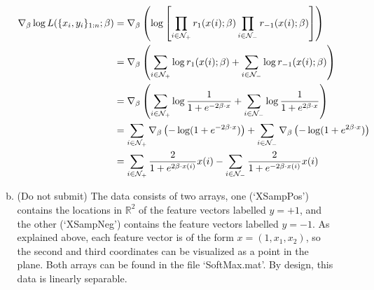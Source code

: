 \documentclass[11pt]{report}
\begin{document}
\begin{enumerate}[1.]
\begin{enumerate}[(a)]
		            \color{blue}
		            \begin{align*}
			            \nabla_{\beta}\log L(\{x_i, y_i\}_{1:n}; \beta) & = \nabla_{\beta}  \left(\log\left[\prod_{i\in{\cal N}_+}r_1(x(i);\beta) \prod_{i\in{\cal N}_-}r_{-1}(x(i);\beta)\right] \right)                                          \\
			                                                            & = \nabla_{\beta} \left(\sum_{i \in \mathcal N_+} \log r_1(x(i);\beta) + \sum_{i \in \mathcal N_-} \log r_{-1}(x(i);\beta)\right)                                         \\
			                                                            & = \nabla_{\beta}\left(\sum_{i \in \mathcal N_+} \log \frac{1}{1 + e^{-2\beta\cdot x}} + \sum_{i \in \mathcal N_-} \log \frac{1}{1 + e^{2\beta\cdot x}}\right)            \\
			                                                            & = \sum_{i \in \mathcal N_+} \nabla_{\beta}\left(-\log(1 + e^{-2\beta\cdot x})\right) + \sum_{i \in \mathcal N_-} \nabla_{\beta}\left(-\log(1 + e^{2\beta\cdot x})\right) \\
			                                                            & = \sum_{i \in \mathcal N_+}  \frac{2}{1 + e^{2\beta\cdot x(i)}} x(i) - \sum_{i \in \mathcal N_-}   \frac{2}{1 + e^{-2\beta\cdot x(i)}} x(i)
		            \end{align*}
		            \color{black}


		      \item {\color{blue} (Do not submit)} The data consists of two arrays, one (`XSampPos') contains the locations in $\mathds{R}^2$ of the feature vectors labelled $y=+1$, and the other (`XSampNeg') contains the feature vectors labelled $y=-1$. As explained above, each feature vector is of the form $x = (1,x_1,x_2)$, so the second and third coordinates can be visualized as a point in the plane. Both arrays can be found in the file `SoftMax.mat'. By design, this data is linearly separable.

		            \begin{enumerate}[(i)]


\end{enumerate}
\end{enumerate}
\end{enumerate}
\end{document}

